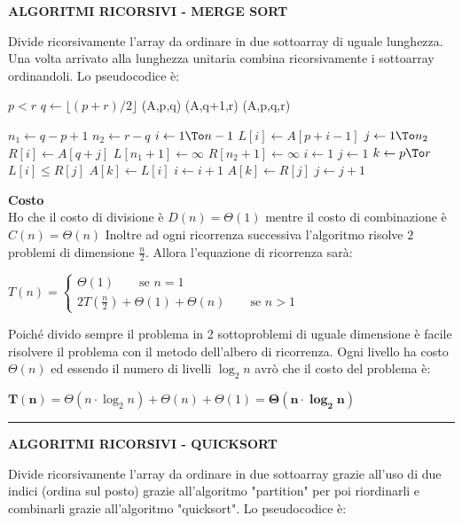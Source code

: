 \documentclass[8pt]{extarticle}
\newenvironment{formulario}
{
\setlength{\columnsep}{3em}
\twocolumn
\lstset{tabsize=3}
\begin{spacing}{1}
\begin{flushleft}
}{
\end{flushleft}
\end{spacing}
}
\newenvironment{tcenter}{
  \par
  \centering
  \setlength{\parskip}{0pt} %
  \noindent
}{
  \par
}
\newenvironment{code}[1]
{
\begin{codebox}
\Procname{$#1$}
}{
\end{codebox}
}
\newcommand{\myRule}{\rule{250pt}{0.1pt}}
\newcommand{\bo}[1]{\textbf{#1}}
\newcommand{\la}{\leftarrow}
\newcommand{\floor}[1]{\lfloor #1 \rfloor}
\newcommand{\FOR}[1]{\For $#1$ \Do}
\newcommand{\IF}[1]{\If $#1$ \Then}
\begin{document}
\begin{formulario}
		\begin{tcenter}
\bo{ALGORITMI RICORSIVI - MERGE SORT}
		\end{tcenter}
Divide ricorsivamente l'array da ordinare in due sottoarray di uguale lunghezza. Una volta arrivato alla lunghezza unitaria combina ricorsivamente i sottoarray ordinandoli. Lo pseudocodice è:
		\begin{code}{MergeSort(A,p,r)}
\li \IF{p<r} 
	\li $q\la \floor{(p+r)/2}$ 
	\li {}(A,p,q)
	\li {}(A,q+1,r)
	\li {}(A,p,q,r)
\End
		\end{code}		
		\begin{code}{Merge(A,p,q,r)}
\li $n_1 \la q-p+1$
\li $n_2 \la r-q$
\li \FOR{i \la 1 \To n-1} 
	\li $L[i] \la A[p+i-1]$
\End
\li \FOR{j \la 1 \To n_2} 
	\li $R[i] \la A[q+j]$
\End
\li $L[n_1+1]\la \infty$
\li $R[n_2+1]\la \infty$
\li $i \la 1$
\li $j \la 1$
\li \FOR{k \la p\To r}
	\li \IF{L[i]\leq R[j]}
		\li $A[k]\la L[i]$
		\li $i \la i+1$
	\li \Else
		\li $A[k]\la R[j]$
		\li $j \la j+1$
	\End
\End
		\end{code}		
\bo{Costo}\\
Ho che il costo di divisione è $D(n)=\Theta(1)$ mentre il costo di combinazione è $C(n)=\Theta(n)$ Inoltre ad ogni ricorrenza successiva l'algoritmo risolve $2$ problemi di dimensione $\frac{n}{2}$. Allora l'equazione di ricorrenza sarà: 
		\begin{tcenter}
$
T(n)=
		\begin{cases}
\Theta(1) \qquad\text{se }n=1 \\
2T(\frac{n}{2})+\Theta(1)+\Theta(n) \qquad\text{se }n>1
		\end{cases}
$
		\end{tcenter}
Poiché divido sempre il problema in 2 sottoproblemi di uguale dimensione è facile risolvere il problema con il metodo dell'albero di ricorrenza. Ogni livello ha costo $\Theta(n)$ ed essendo il numero di livelli $\log_2 n$ avrò che il costo del problema è:
		\begin{tcenter} 
$\mathbf{T(n)=}\Theta(n\cdot \log_2 n) + \Theta(n) + \Theta(1)=\mathbf{\Theta(n\cdot \log_2 n)}$
		\end{tcenter}
\myRule

		\begin{tcenter}
\bf{ALGORITMI RICORSIVI - QUICKSORT}
		\end{tcenter}
Divide ricorsivamente l'array da ordinare in due sottoarray grazie all'uso di due indici (ordina sul posto) grazie all'algoritmo "partition" per poi riordinarli e combinarli grazie all'algoritmo "quicksort". Lo pseudocodice è:


\end{formulario}
\end{document}
